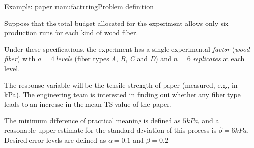 \begin{frame}{Example: paper manufacturing}{Problem definition}

Suppose that the total budget allocated for the experiment allows only six production runs for each kind of wood fiber.
\bigskip

Under these specifications, the experiment has a single experimental \textit{factor} (\textit{wood fiber}) with $a = 4$ \textit{levels} (fiber types \textit{A}, \textit{B}, \textit{C} and \textit{D}) and $n = 6$ \textit{replicates} at each level.
\bigskip

The response variable will be the tensile strength of paper (measured, e.g., in kPa). The engineering team is interested in finding out whether any fiber type leads to an increase in the mean TS value of the paper.
\bigskip

The minimum difference of practical meaning is defined as $5 kPa$, and a reasonable upper estimate for the standard deviation of this process is $\hat{\sigma} = 6 kPa$. Desired error levels are defined as $\alpha = 0.1$ and $\beta = 0.2$.
\end{frame}


